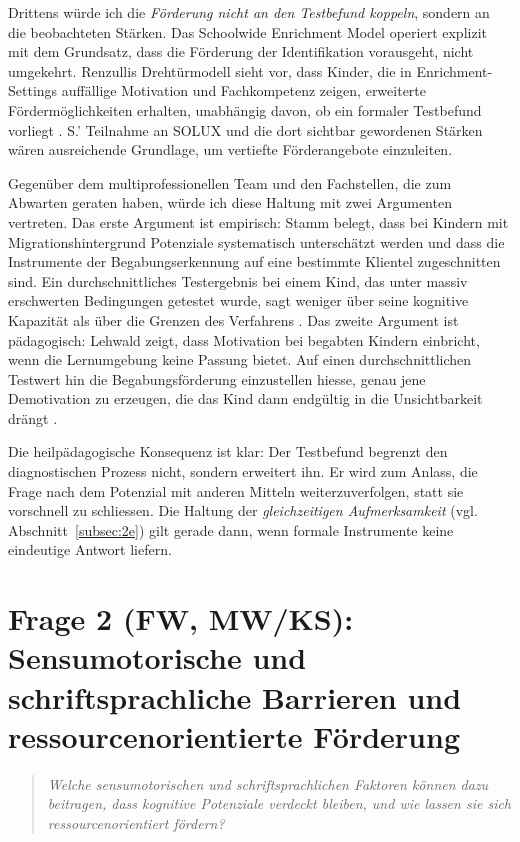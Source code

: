 \documentclass[ngerman, a4paper]{article}
\begin{document}
Drittens würde ich die \textit{Förderung nicht an den Testbefund koppeln}, sondern
an die beobachteten Stärken. Das Schoolwide Enrichment Model operiert explizit mit
dem Grundsatz, dass die Förderung der Identifikation vorausgeht, nicht umgekehrt.
Renzullis Drehtürmodell sieht vor, dass Kinder, die in Enrichment-Settings
auffällige Motivation und Fachkompetenz zeigen, erweiterte Fördermöglichkeiten
erhalten, unabhängig davon, ob ein formaler Testbefund vorliegt
\parencite{muelleroppliger2021handbuch,fischer2020begabungsfoerderung}. S.'
Teilnahme an SOLUX und die dort sichtbar gewordenen Stärken wären ausreichende
Grundlage, um vertiefte Förderangebote einzuleiten.

Gegenüber dem multiprofessionellen Team und den Fachstellen, die zum Abwarten
geraten haben, würde ich diese Haltung mit zwei Argumenten vertreten. Das erste
Argument ist empirisch: Stamm belegt, dass bei Kindern mit Migrationshintergrund
Potenziale systematisch unterschätzt werden und dass die Instrumente der
Begabungserkennung auf eine bestimmte Klientel zugeschnitten sind. Ein
durchschnittliches Testergebnis bei einem Kind, das unter massiv erschwerten
Bedingungen getestet wurde, sagt weniger über seine kognitive Kapazität als über
die Grenzen des Verfahrens \parencite{stamm2021fehlenderblick}. Das zweite Argument
ist pädagogisch: Lehwald zeigt, dass Motivation bei begabten Kindern einbricht,
wenn die Lernumgebung keine Passung bietet. Auf einen durchschnittlichen Testwert
hin die Begabungsförderung einzustellen hiesse, genau jene Demotivation zu
erzeugen, die das Kind dann endgültig in die Unsichtbarkeit drängt
\parencite{lehwald2017motivation}.

Die heilpädagogische Konsequenz ist klar: Der Testbefund begrenzt den
diagnostischen Prozess nicht, sondern erweitert ihn. Er wird zum Anlass, die
Frage nach dem Potenzial mit anderen Mitteln weiterzuverfolgen, statt sie
vorschnell zu schliessen. Die Haltung der \textit{gleichzeitigen Aufmerksamkeit}
(vgl. Abschnitt~\ref{subsec:2e}) gilt gerade dann, wenn formale Instrumente keine eindeutige
Antwort liefern.

\newpage
\section{Frage 2 (FW, MW/KS): Sensumotorische und schriftsprachliche Barrieren
  und ressourcenorientierte Förderung}
\label{sec:frage2}
 
\begin{quote}\itshape
Welche sensumotorischen und schriftsprachlichen Faktoren können dazu beitragen,
dass kognitive Potenziale verdeckt bleiben, und wie lassen sie sich
ressourcenorientiert fördern?
\end{quote}
\end{document}
